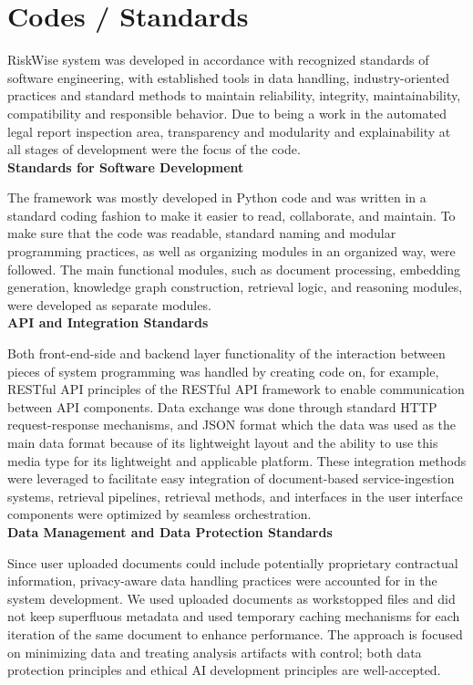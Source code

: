 \section{Codes / Standards}
RiskWise system was developed in accordance with recognized standards
of software engineering, with established tools in data handling,
industry-oriented practices and standard methods to maintain
reliability, integrity, maintainability, compatibility and
responsible behavior. Due to being a work in the automated legal
report inspection area, transparency and modularity and
explainability at all stages of development were the focus of the code.
\\

\textbf{Standards for Software Development}

The framework was mostly developed in Python code and was written in
a standard coding fashion to make it easier to read, collaborate, and
maintain. To make sure that the code was readable, standard naming
and modular programming practices, as well as organizing modules in
an organized way, were followed. The main functional modules, such as
document processing, embedding generation, knowledge graph
construction, retrieval logic, and reasoning modules, were developed
as separate modules.
\\

\textbf{API and Integration Standards}

Both front-end-side and backend layer functionality of the
interaction between pieces of system programming was handled by
creating code on, for example, RESTful API principles of the RESTful
API framework to enable communication between API components. Data
exchange was done through standard HTTP request-response mechanisms,
and JSON format which the data was used as the main data format
because of its lightweight layout and the ability to use this media
type for its lightweight and applicable platform. These integration
methods were leveraged to facilitate easy integration of
document-based service-ingestion systems, retrieval pipelines,
retrieval methods, and interfaces in the user interface components
were optimized by seamless orchestration.
\\

\textbf{Data Management and Data Protection Standards}

Since user uploaded documents could include potentially proprietary
contractual information, privacy-aware data handling practices were
accounted for in the system development. We used uploaded documents
as workstopped files and did not keep superfluous metadata and used
temporary caching mechanisms for each iteration of the same document
to enhance performance. The approach is focused on minimizing data
and treating analysis artifacts with control; both data protection
principles and ethical AI development principles are well-accepted.
\\

